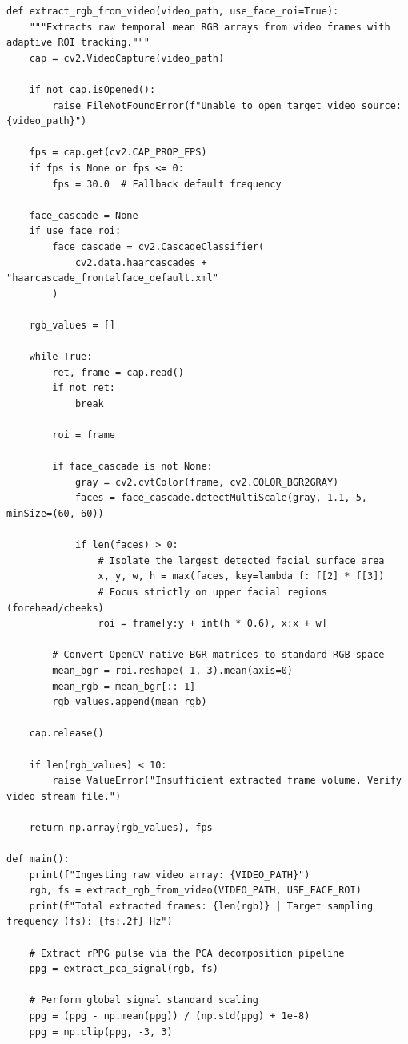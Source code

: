 \begin{verbatim}
def extract_rgb_from_video(video_path, use_face_roi=True):
    """Extracts raw temporal mean RGB arrays from video frames with adaptive ROI tracking."""
    cap = cv2.VideoCapture(video_path)

    if not cap.isOpened():
        raise FileNotFoundError(f"Unable to open target video source: {video_path}")

    fps = cap.get(cv2.CAP_PROP_FPS)
    if fps is None or fps <= 0:
        fps = 30.0  # Fallback default frequency

    face_cascade = None
    if use_face_roi:
        face_cascade = cv2.CascadeClassifier(
            cv2.data.haarcascades + "haarcascade_frontalface_default.xml"
        )

    rgb_values = []

    while True:
        ret, frame = cap.read()
        if not ret:
            break

        roi = frame

        if face_cascade is not None:
            gray = cv2.cvtColor(frame, cv2.COLOR_BGR2GRAY)
            faces = face_cascade.detectMultiScale(gray, 1.1, 5, minSize=(60, 60))

            if len(faces) > 0:
                # Isolate the largest detected facial surface area
                x, y, w, h = max(faces, key=lambda f: f[2] * f[3])
                # Focus strictly on upper facial regions (forehead/cheeks)
                roi = frame[y:y + int(h * 0.6), x:x + w]

        # Convert OpenCV native BGR matrices to standard RGB space
        mean_bgr = roi.reshape(-1, 3).mean(axis=0)
        mean_rgb = mean_bgr[::-1]
        rgb_values.append(mean_rgb)

    cap.release()

    if len(rgb_values) < 10:
        raise ValueError("Insufficient extracted frame volume. Verify video stream file.")

    return np.array(rgb_values), fps

def main():
    print(f"Ingesting raw video array: {VIDEO_PATH}")
    rgb, fs = extract_rgb_from_video(VIDEO_PATH, USE_FACE_ROI)
    print(f"Total extracted frames: {len(rgb)} | Target sampling frequency (fs): {fs:.2f} Hz")

    # Extract rPPG pulse via the PCA decomposition pipeline
    ppg = extract_pca_signal(rgb, fs)

    # Perform global signal standard scaling
    ppg = (ppg - np.mean(ppg)) / (np.std(ppg) + 1e-8)
    ppg = np.clip(ppg, -3, 3)


\end{verbatim}
